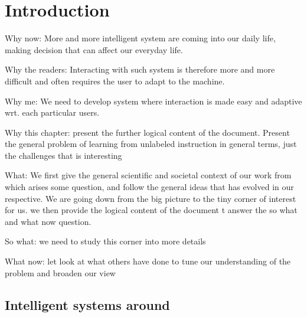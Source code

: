 \renewcommand{\chapterpath}{\allchapterspath/introduction}
\renewcommand{\imgpath}{\chapterpath/img}

\chapter{Introduction}
\label{chapter:introduction}
\minitoc

Why now: More and more intelligent system are coming into our daily life, making decision that can affect our everyday life. 

Why the readers: Interacting with such system is therefore more and more difficult and often requires the user to adapt to the machine.

Why me: We need to develop system where interaction is made easy and adaptive wrt. each particular users. 

Why this chapter: present the further logical content of the document. Present the general problem of learning from unlabeled instruction in general terms, just the challenges that is interesting 

What: We first give the general scientific and societal context of our work from which arises some question, and follow the general ideas that has evolved in our respective. We are going down from the big picture to the tiny corner of interest for us. we then provide the logical content of the document t answer the so what and what now question.

So what: we need to study this corner into more details

What now: let look at what others have done to tune our understanding of the problem and broaden our view

\section{Intelligent systems around}

